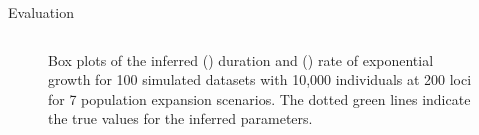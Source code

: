 \documentclass[final,hyperref={pdfpagelabels=false},professionalfonts,mathserif]{beamer}
\begin{document}
\begin{frame}[fragile]
\begin{columns}[t]
\begin{column}{.495\linewidth}
\begin{block}{\large Evaluation}
\begin{columns}[T]
\begin{column}{0.97\linewidth}
\begin{figure}[H]
\begin{subfigure}[b]{0.48\linewidth}
				        \caption{}
				      \label{fig:inferred_params_1epoch_growth_rate}
				    \end{subfigure}
				    \label{fig:inferred_params_1epoch}
				    \caption{
				    Box plots of the inferred (\protect{}) duration and (\protect{}) rate of exponential growth for 100 simulated datasets with 10,000 individuals at 200 loci for 7 population expansion scenarios. The dotted green lines indicate the true values for the inferred parameters. %
				    }
				\end{figure}


\end{column}
\end{columns}
\end{block}
\end{column}
\end{columns}
\end{frame}
\end{document}
